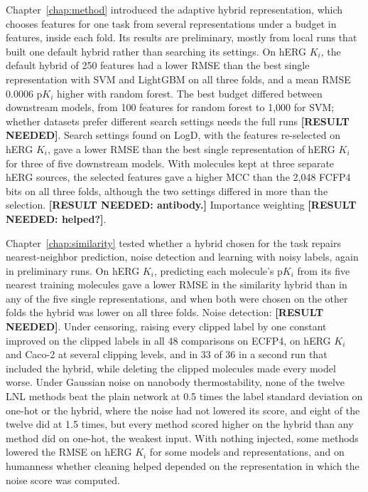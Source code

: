 Chapter~\ref{chap:method} introduced the adaptive hybrid representation, which chooses features for one task from several representations under a budget in features, inside each fold. Its results are preliminary, mostly from local runs that built one default hybrid rather than searching its settings. On hERG $K_i$, the default hybrid of 250 features had a lower RMSE than the best single representation with SVM and LightGBM on all three folds, and a mean RMSE 0.0006 p$K_i$ higher with random forest. The best budget differed between downstream models, from 100 features for random forest to 1,000 for SVM; whether datasets prefer different search settings needs the full runs \textbf{[RESULT NEEDED]}. Search settings found on LogD, with the features re-selected on hERG $K_i$, gave a lower RMSE than the best single representation of hERG $K_i$ for three of five downstream models. With molecules kept at three separate hERG sources, the selected features gave a higher MCC than the 2,048 FCFP4 bits on all three folds, although the two settings differed in more than the selection. \textbf{[RESULT NEEDED: antibody.]} Importance weighting \textbf{[RESULT NEEDED: helped?]}.

Chapter~\ref{chap:similarity} tested whether a hybrid chosen for the task repairs nearest-neighbor prediction, noise detection and learning with noisy labels, again in preliminary runs. On hERG $K_i$, predicting each molecule's p$K_i$ from its five nearest training molecules gave a lower RMSE in the similarity hybrid than in any of the five single representations, and when both were chosen on the other folds the hybrid was lower on all three folds. Noise detection: \textbf{[RESULT NEEDED]}. Under censoring, raising every clipped label by one constant improved on the clipped labels in all 48 comparisons on ECFP4, on hERG $K_i$ and Caco-2 at several clipping levels, and in 33 of 36 in a second run that included the hybrid, while deleting the clipped molecules made every model worse. Under Gaussian noise on nanobody thermostability, none of the twelve LNL methods beat the plain network at 0.5 times the label standard deviation on one-hot or the hybrid, where the noise had not lowered its score, and eight of the twelve did at 1.5 times, but every method scored higher on the hybrid than any method did on one-hot, the weakest input. With nothing injected, some methods lowered the RMSE on hERG $K_i$ for some models and representations, and on humanness whether cleaning helped depended on the representation in which the noise score was computed.

